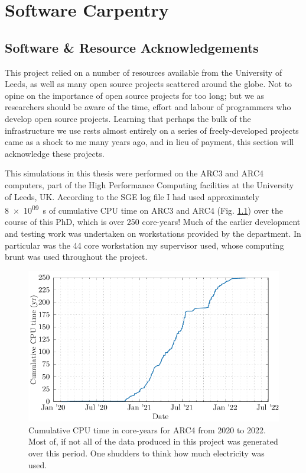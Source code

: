 \chapter{Software Carpentry}

\section{Software \& Resource Acknowledgements}

This project relied on a number of resources available from the University of Leeds, as well as many open source projects scattered around the globe.
Not to opine on the importance of open source projects for too long; but we as researchers should be aware of the time, effort and labour of programmers who develop open source projects.
Learning that perhaps the bulk of the infrastructure we use rests almost entirely on a series of freely-developed projects came as a shock to me many years ago, and in lieu of payment, this section will acknowledge these projects.

This simulations in this thesis were performed on the ARC3 and ARC4 computers, part of the High Performance Computing facilities at the University of Leeds, UK.
According to the SGE log file I had used approximately \SI{8e+09}{s} of cumulative CPU time on ARC3 and ARC4 (Fig. \ref{fig:cpugraph}) over the course of this PhD, which is over \num{250} core-years!
Much of the earlier development and testing work was undertaken on workstations provided by the department.
In particular was the 44 core workstation my supervisor used, whose computing brunt was used  throughout the project.

\begin{figure}
  \centering
  \includegraphics[]{assets/cpu_time.pdf}
  \caption[Cumulative CPU time on ARC4]{Cumulative CPU time in core-years for ARC4 from 2020 to 2022. Most of, if not all of the data produced in this project was generated over this period. One shudders to think how much electricity was used.}
  \label{fig:cpugraph}
\end{figure}

